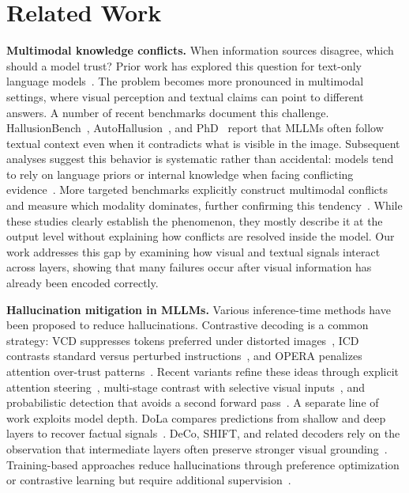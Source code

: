 
\section{Related Work}


\textbf{Multimodal knowledge conflicts.} When information sources disagree, which should a model trust? Prior work has explored this question for text-only language models~\cite{Rich_Knowledge_Sources,xu-etal-2024-knowledge-conflicts,xie2023adaptive}. The problem becomes more pronounced in multimodal settings, where visual perception and textual claims can point to different answers. A number of recent benchmarks document this challenge. HallusionBench~\cite{Hallusionbench}, AutoHallusion~\cite{wu2024autohallusion}, and PhD~\cite{PhD_ChatGPT} report that MLLMs often follow textual context even when it contradicts what is visible in the image. Subsequent analyses suggest this behavior is systematic rather than accidental: models tend to rely on language priors or internal knowledge when facing conflicting evidence~\cite{Insight_Over_Sight,nguyen2025challenges,deng2025words}. More targeted benchmarks explicitly construct multimodal conflicts and measure which modality dominates, further confirming this tendency~\cite{jia2025benchmarking,zhang2025evaluating,zhu2024crossmodalityconflict}. While these studies clearly establish the phenomenon, they mostly describe it at the output level without explaining how conflicts are resolved inside the model. Our work addresses this gap by examining how visual and textual signals interact across layers, showing that many failures occur after visual information has already been encoded correctly.


\textbf{Hallucination mitigation in MLLMs.} Various inference-time methods have been proposed to reduce hallucinations. Contrastive decoding is a common strategy: VCD suppresses tokens preferred under distorted images~\cite{liu2023mitigating}, ICD contrasts standard versus perturbed instructions~\cite{icd2024}, and OPERA penalizes attention over-trust patterns~\cite{huang2024opera}. Recent variants refine these ideas through explicit attention steering~\cite{wang2025ascd}, multi-stage contrast with selective visual inputs~\cite{park2025second}, and probabilistic detection that avoids a second forward pass~\cite{fieback2025ecd}. A separate line of work exploits model depth. DoLa compares predictions from shallow and deep layers to recover factual signals~\cite{dola2024}. DeCo, SHIFT, and related decoders rely on the observation that intermediate layers often preserve stronger visual grounding~\cite{wang2024deco,wang2025shift,layercd_2025}. Training-based approaches reduce hallucinations through preference optimization or contrastive learning but require additional supervision~\cite{wang-etal-2024-mdpo,Yu_2024_CVPR,jiang2024hallucination}.


